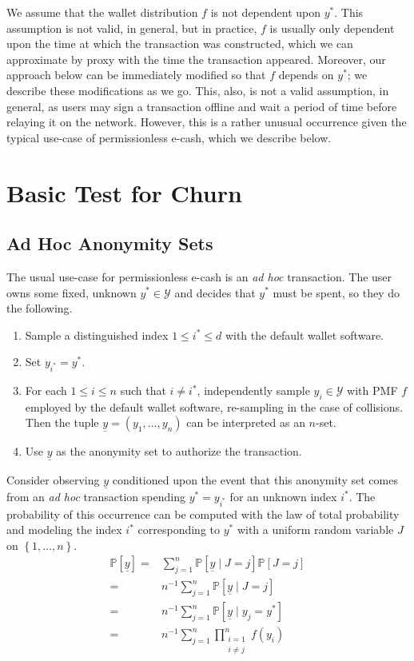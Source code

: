 \documentclass{tran-l}
\theoremstyle{cor}
\theoremstyle{definition}
\theoremstyle{remark}
\theoremstyle{conjecture}
\numberwithin{equation}{section}
\begin{document}
We assume that the wallet distribution $f$ is not dependent upon $y^*$.
This assumption is not valid, in general, but in practice, $f$ is usually only dependent upon the time at which the transaction was constructed, which we can approximate by proxy with the time the transaction appeared.
Moreover, our approach below can be immediately modified so that $f$ depends on $y^*$; we describe these modifications as we go.
This, also, is not a valid assumption, in general, as users may sign a transaction offline and wait a period of time before relaying it on the network.
However, this is a rather unusual occurrence given the typical use-case of permissionless e-cash, which we describe below.

\section{Basic Test for Churn}\label{sec:basic_test}



\subsection{Ad Hoc Anonymity Sets}\label{sec:basic_test_ad_hoc_transactions}

The usual use-case for permissionless e-cash is an \textit{ad hoc} transaction.
The user owns some fixed, unknown $y^* \in \mathcal{Y}$ and decides that $y^*$ must be spent, so they do the following.
\begin{enumerate}
\item Sample a distinguished index $1 \leq i^* \leq d$ with the default wallet software.
\item Set $y_{i^*} = y^*$.
\item For each $1 \leq i \leq n$ such that $i \neq i^*$, independently sample $y_i \in \mathcal{Y}$ with PMF $f$ employed by the default wallet software, re-sampling in the case of collisions. Then the tuple $\underline{y} = (y_1, \ldots, y_n)$ can be interpreted as an $n$-set.
\item Use $\underline{y}$ as the anonymity set to authorize the transaction.
\end{enumerate}

Consider observing $\underline{y}$ conditioned upon the event that this anonymity set comes from an \textit{ad hoc} transaction spending $y^*=y_{i^*}$ for an unknown index $i^*$.
The probability of this occurrence can be computed with the law of total probability and modeling the index $i^*$ corresponding to $y^*$ with a uniform random variable $J$ on $\left\{1, \ldots, n\right\}$.
\begin{align}
\mathbb{P}[\underline{y}] =& \sum_{j=1}^{n} \mathbb{P}[\underline{y} \mid J = j] \mathbb{P}[J= j] \\
=& n^{-1} \sum_{j=1}^{n} \mathbb{P}[\underline{y} \mid J = j]  \\
=& n^{-1} \sum_{j=1}^{n} \mathbb{P}[\underline{y} \mid y_j = y^*] \\
=& n^{-1} \sum_{j=1}^{n} \prod_{\substack{i = 1 \\ i \neq j}}^n f(y_i) \label{eqn:pmf_ad_hoc}
\end{align}
\end{document}
